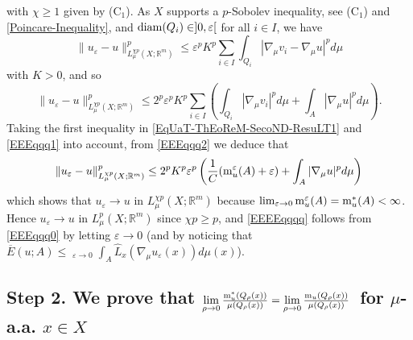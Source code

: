 \documentclass[10pt]{amsart}
\numberwithin{equation}{section}
\theoremstyle{definition}
\theoremstyle{remark}
\begin{document}
with $\chi\geq 1$ given by (C$_1$). As $X$ supports a $p$-Sobolev inequality, see (C$_1$) and \eqref{Poincare-Inequality}, and ${\rm diam}(Q_i)\in]0,{\varepsilon}[$ for all $i\in I$, we have
$$
\|u_{\varepsilon}-u\|^{p}_{L^{\chi p}_\mu(X;{{\mathbb R}}^m)}\leq{\varepsilon}^{p} {K}^{p}\sum_{i\in I}\int_{Q_{i}}|\nabla_\mu v_i-\nabla_\mu u|^pd\mu
$$
with $K>0$, and so
\begin{equation}\label{EEEqqq2}
\|u_{\varepsilon}-u\|^{p}_{L^{\chi p}_\mu(X;{{\mathbb R}}^m)}\leq 2^p{\varepsilon}^{p} {K}^{p}\sum_{i\in I}\left(\int_{Q_{i}}|\nabla_\mu v_i|^pd\mu+\int_A|\nabla_\mu u|^pd\mu\right).
\end{equation}
Taking the first inequality in \eqref{EqUaT-ThEoReM-SecoND-ResuLT1} and \eqref{EEEqqq1} into account, from \eqref{EEEqqq2} we deduce that
$$
\|u_{\varepsilon}-u\|^p_{L^{\chi p}_\mu(X;{{\mathbb R}}^m)}\leq 2^p{K}^{p}{\varepsilon}^{p}\left({1\over C}({\rm m}^{\varepsilon}_u(A)+{\varepsilon})+\int_A|\nabla_\mu u|^pd\mu\right)
$$
which shows that $u_{\varepsilon}\to u$ in $L^{\chi p}_\mu(X;{{\mathbb R}}^m)$ because $\lim_{{\varepsilon}\to0}{\rm m}_u^{\varepsilon}(A)={\rm m}^*_u(A)<\infty$. Hence  $u_{\varepsilon}\to u$ in $L^{p}_\mu(X;{{\mathbb R}}^m)$ since $\chi p\geq p$, and \eqref{EEEEqqqq} follows from \eqref{EEEqqq0} by letting ${\varepsilon}\to 0$ (and by noticing that $\overline{E}(u;A)\leq{\mathop{\underline{\lim}}}_{{\varepsilon}\to0}\int_A\widehat{L}_x(\nabla_\mu u_{\varepsilon}(x))d\mu(x)$).

\subsection*{Step 2. We prove that \boldmath$\lim\limits_{\rho\to0}{{\rm m}_u^*(Q_\rho(x))\over\mu(Q_\rho(x))}=\lim\limits_{\rho\to 0}{{\rm m}_u(Q_\rho(x))\over\mu(Q_\rho(x))}$\unboldmath\ for \boldmath$\mu$\unboldmath-a.a. \boldmath$x\in X$\unboldmath}
\end{document}
